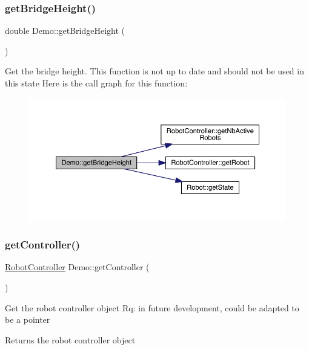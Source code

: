 \subsubsection{\texorpdfstring{get\+Bridge\+Height()}{getBridgeHeight()}}
{\footnotesize\ttfamily double Demo\+::get\+Bridge\+Height (\begin{DoxyParamCaption}{ }\end{DoxyParamCaption})}

Get the bridge height. This function is not up to date and should not be used in this state Here is the call graph for this function\+:\nopagebreak
\begin{figure}[H]
\begin{center}
\leavevmode
\includegraphics[width=350pt]{class_demo_ac6657b0f7f55a81ba215811d31d9e5b5_cgraph}
\end{center}
\end{figure}
\mbox{\label{class_demo_af3f1105a11288fd13d54e85ef2485da5}} 
\subsubsection{\texorpdfstring{get\+Controller()}{getController()}}
{\footnotesize\ttfamily \mbox{\hyperlink{class_robot_controller}{Robot\+Controller}} Demo\+::get\+Controller (\begin{DoxyParamCaption}{ }\end{DoxyParamCaption})}

Get the robot controller object Rq\+: in future development, could be adapted to be a pointer \begin{DoxyReturn}{Returns}
the robot controller object 
\end{DoxyReturn}
\mbox{\label{class_demo_acd4e28d1626c6979bbab2e396b717cba}} 
